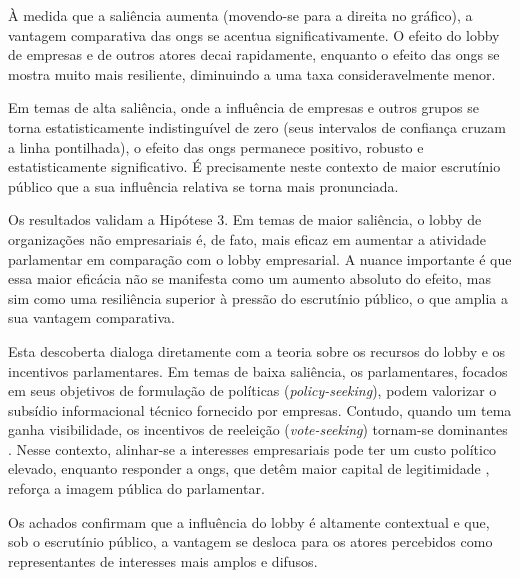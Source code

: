 À medida que a saliência aumenta (movendo-se para a direita no gráfico), a vantagem comparativa das \acrshort{ong}s se acentua significativamente. O efeito do lobby de empresas e de outros atores decai rapidamente, enquanto o efeito das \acrshort{ong}s se mostra muito mais resiliente, diminuindo a uma taxa consideravelmente menor.
    
Em temas de alta saliência, onde a influência de empresas e outros grupos se torna estatisticamente indistinguível de zero (seus intervalos de confiança cruzam a linha pontilhada), o efeito das \acrshort{ong}s permanece positivo, robusto e estatisticamente significativo. É precisamente neste contexto de maior escrutínio público que a sua influência relativa se torna mais pronunciada.

Os resultados validam a Hipótese 3. Em temas de maior saliência, o lobby de organizações não empresariais é, de fato, mais eficaz em aumentar a atividade parlamentar em comparação com o lobby empresarial. A nuance importante é que essa maior eficácia não se manifesta como um aumento absoluto do efeito, mas sim como uma resiliência superior à pressão do escrutínio público, o que amplia a sua vantagem comparativa.

Esta descoberta dialoga diretamente com a teoria sobre os recursos do lobby e os incentivos parlamentares. Em temas de baixa saliência, os parlamentares, focados em seus objetivos de formulação de políticas (\textit{policy-seeking}), podem valorizar o subsídio informacional técnico fornecido por empresas. Contudo, quando um tema ganha visibilidade, os incentivos de reeleição (\textit{vote-seeking}) tornam-se dominantes \cite{mayhew2004congress}. Nesse contexto, alinhar-se a interesses empresariais pode ter um custo político elevado, enquanto responder a \acrshort{ong}s, que detêm maior capital de legitimidade \cite{bunea2018legitimacy}, reforça a imagem pública do parlamentar.

Os achados confirmam que a influência do lobby é altamente contextual e que, sob o escrutínio público, a vantagem se desloca para os atores percebidos como representantes de interesses mais amplos e difusos.
